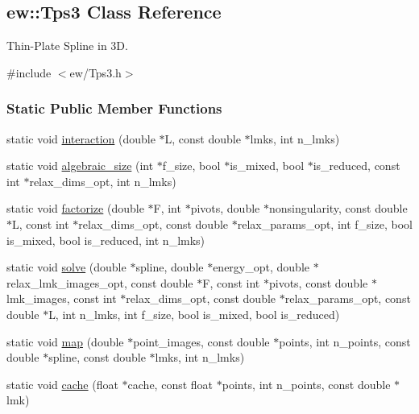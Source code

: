 \hypertarget{classew_1_1Tps3}{
\subsection{ew::Tps3 Class Reference}
\label{classew_1_1Tps3}
}


Thin-\/Plate Spline in 3D.  




{\ttfamily \#include $<$ew/Tps3.h$>$}

\subsubsection*{Static Public Member Functions}
\begin{DoxyCompactItemize}
\item 
static void \hyperlink{classew_1_1Tps3_add5597fd0edb1437c9694d765c507aff}{interaction} (double $\ast$L, const double $\ast$lmks, int n\_\-lmks)
\item 
static void \hyperlink{classew_1_1Tps3_a11e70148259244e2c975dabd72ceb28c}{algebraic\_\-size} (int $\ast$f\_\-size, bool $\ast$is\_\-mixed, bool $\ast$is\_\-reduced, const int $\ast$relax\_\-dims\_\-opt, int n\_\-lmks)
\item 
static void \hyperlink{classew_1_1Tps3_abc71d05432b69dcaab46b5a2e2dc5e2a}{factorize} (double $\ast$F, int $\ast$pivots, double $\ast$nonsingularity, const double $\ast$L, const int $\ast$relax\_\-dims\_\-opt, const double $\ast$relax\_\-params\_\-opt, int f\_\-size, bool is\_\-mixed, bool is\_\-reduced, int n\_\-lmks)
\item 
static void \hyperlink{classew_1_1Tps3_acf2ff420aa319fa03e4ae0efbdbb420a}{solve} (double $\ast$spline, double $\ast$energy\_\-opt, double $\ast$relax\_\-lmk\_\-images\_\-opt, const double $\ast$F, const int $\ast$pivots, const double $\ast$lmk\_\-images, const int $\ast$relax\_\-dims\_\-opt, const double $\ast$relax\_\-params\_\-opt, const double $\ast$L, int n\_\-lmks, int f\_\-size, bool is\_\-mixed, bool is\_\-reduced)
\item 
static void \hyperlink{classew_1_1Tps3_a0ccbf7e7cc36166e6d4c9e0353253cf3}{map} (double $\ast$point\_\-images, const double $\ast$points, int n\_\-points, const double $\ast$spline, const double $\ast$lmks, int n\_\-lmks)
\item 
static void \hyperlink{classew_1_1Tps3_ae7698c93f60039fa422e620658b254cf}{cache} (float $\ast$cache, const float $\ast$points, int n\_\-points, const double $\ast$lmk)
\item 

\end{DoxyCompactItemize}
